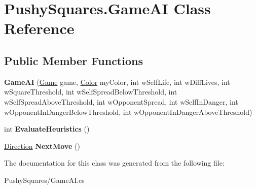 \hypertarget{class_pushy_squares_1_1_game_a_i}{}\section{Pushy\+Squares.\+Game\+AI Class Reference}
\label{class_pushy_squares_1_1_game_a_i}
\subsection*{Public Member Functions}
\begin{DoxyCompactItemize}
\item 
\mbox{\label{class_pushy_squares_1_1_game_a_i_abb4bd8efc63fe522a314e580c3997506}} 
{\bfseries Game\+AI} (\hyperlink{class_pushy_squares_1_1_game}{Game} game, \hyperlink{namespace_pushy_squares_a456c990da0c8e2089c171d31f7e27574}{Color} my\+Color, int w\+Self\+Life, int w\+Diff\+Lives, int w\+Square\+Threshold, int w\+Self\+Spread\+Below\+Threshold, int w\+Self\+Spread\+Above\+Threshold, int w\+Opponent\+Spread, int w\+Self\+In\+Danger, int w\+Opponent\+In\+Danger\+Below\+Threshold, int w\+Opponent\+In\+Danger\+Above\+Threshold)
\item 
\mbox{\label{class_pushy_squares_1_1_game_a_i_a6f36354c78cba93d37ab6cf8accf627a}} 
int {\bfseries Evaluate\+Heuristics} ()
\item 
\mbox{\label{class_pushy_squares_1_1_game_a_i_ae6c6052f516bb6db88700b6a88a46bc6}} 
\hyperlink{namespace_pushy_squares_acc0b0bbd9a5171048a288222e2a4d00b}{Direction} {\bfseries Next\+Move} ()
\end{DoxyCompactItemize}


The documentation for this class was generated from the following file\+:\begin{DoxyCompactItemize}
\item 
Pushy\+Squares/Game\+A\+I.\+cs\end{DoxyCompactItemize}
